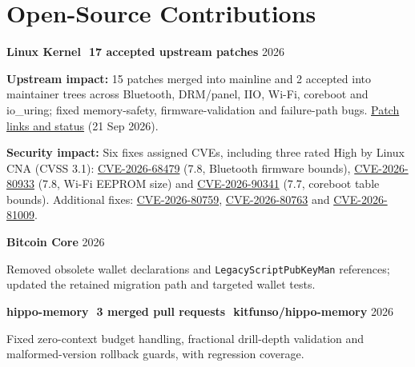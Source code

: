 \documentclass[10pt,letterpaper]{article}
\newcommand{\entry}[2]{%
  \needspace{3\baselineskip}\vspace{2.1pt}%
  {\bfseries\fontsize{10.1}{11.8}\selectfont #1}\hfill
  {\fontsize{9.1}{11}\selectfont\color{slate}#2}\par\vspace{0.4pt}}
\newcommand{\divider}{\textcolor{accentblue}{\,\textbar\,}}
\begin{document}
\section{Open-Source Contributions}
\entry{Linux Kernel \divider 17 accepted upstream patches}{2026}
\begin{tight}
  \item \textbf{Upstream impact:} 15 patches merged into mainline and 2 accepted into maintainer trees across Bluetooth, DRM/panel, IIO, Wi-Fi, coreboot and io\_uring; fixed memory-safety, firmware-validation and failure-path bugs. \href{https://laxmanacharya.com.np/#dispatches}{Patch links and status} (21 Sep 2026).
  \item \textbf{Security impact:} Six fixes assigned CVEs, including three rated High by Linux CNA (CVSS 3.1): \href{https://www.cve.org/CVERecord?id=CVE-2026-68479}{CVE-2026-68479} (7.8, Bluetooth firmware bounds), \href{https://www.cve.org/CVERecord?id=CVE-2026-80933}{CVE-2026-80933} (7.8, Wi-Fi EEPROM size) and \href{https://www.cve.org/CVERecord?id=CVE-2026-90341}{CVE-2026-90341} (7.7, coreboot table bounds). Additional fixes: \href{https://www.cve.org/CVERecord?id=CVE-2026-80759}{CVE-2026-80759}, \href{https://www.cve.org/CVERecord?id=CVE-2026-80763}{CVE-2026-80763} and \href{https://www.cve.org/CVERecord?id=CVE-2026-81009}{CVE-2026-81009}.
\end{tight}

\entry{Bitcoin Core}{2026}
\begin{tight}
  \item Removed obsolete wallet declarations and \texttt{LegacyScriptPubKeyMan} references; updated the retained migration path and targeted wallet tests.
\end{tight}

\entry{hippo-memory \divider 3 merged pull requests \divider kitfunso/hippo-memory}{2026}
\begin{tight}
  \item Fixed zero-context budget handling, fractional drill-depth validation and malformed-version rollback guards, with regression coverage.
\end{tight}

\end{document}
